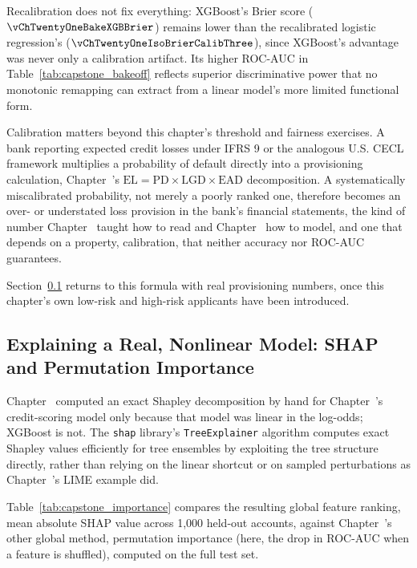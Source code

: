 \documentclass[../ai_in_finance]{subfiles}
\begin{document}
Recalibration does not fix everything: XGBoost's Brier score ($\vChTwentyOneBakeXGBBrier$) remains lower than the recalibrated logistic regression's ($\vChTwentyOneIsoBrierCalibThree$), since XGBoost's advantage was never only a calibration artifact. Its higher ROC-AUC in Table~\ref{tab:capstone_bakeoff} reflects superior discriminative power that no monotonic remapping can extract from a linear model's more limited functional form.

Calibration matters beyond this chapter's threshold and fairness exercises. A bank reporting expected credit losses under IFRS 9 or the analogous U.S. CECL framework multiplies a probability of default directly into a provisioning calculation, Chapter~'s $\text{EL} = \text{PD} \times \text{LGD} \times \text{EAD}$ decomposition. A systematically miscalibrated probability, not merely a poorly ranked one, therefore becomes an over- or understated loss provision in the bank's financial statements, the kind of number Chapter~ taught how to read and Chapter~ how to model, and one that depends on a property, calibration, that neither accuracy nor ROC-AUC guarantees.

Section~\ref{sec:capstone-explain} returns to this formula with real provisioning numbers, once this chapter's own low-risk and high-risk applicants have been introduced.

\subsection{Explaining a Real, Nonlinear Model: SHAP and Permutation Importance}
\label{sec:capstone-explain}

Chapter~ computed an exact Shapley decomposition by hand for Chapter~'s credit-scoring model only because that model was linear in the log-odds; XGBoost is not. The \texttt{shap} library's \texttt{TreeExplainer} algorithm computes exact Shapley values efficiently for tree ensembles by exploiting the tree structure directly, rather than relying on the linear shortcut or on sampled perturbations as Chapter~'s LIME example did.

Table~\ref{tab:capstone_importance} compares the resulting global feature ranking, mean absolute SHAP value across 1,000 held-out accounts, against Chapter~'s other global method, permutation importance (here, the drop in ROC-AUC when a feature is shuffled), computed on the full test set.
\end{document}
